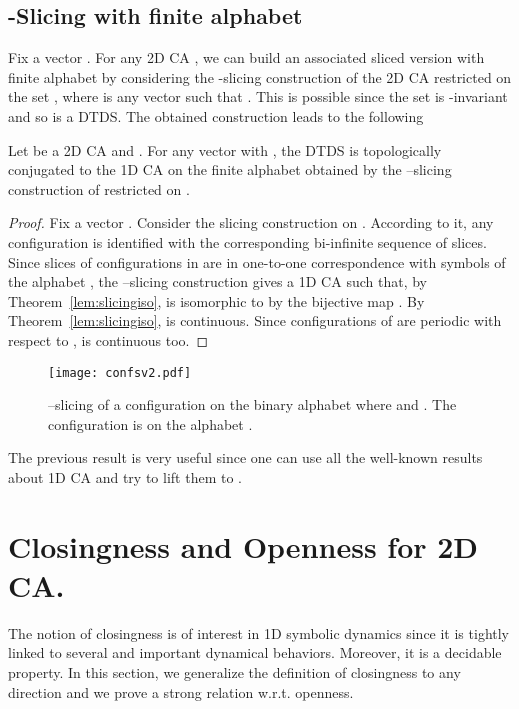 \documentclass{llncs}
\begin{document}
\subsection{-Slicing with finite alphabet}
Fix a vector . For any 2D CA , we can build an
associated sliced version  with finite alphabet by
considering the -slicing construction of the 2D CA restricted
on the set , where  is any vector such that
. This is possible since the set  is
-invariant and so  is a DTDS. The obtained
construction leads to the following
\begin{theorem}\label{lem:bz1d}
Let  be a 2D CA and . For any vector 
with , the DTDS  is topologically
conjugated to the 1D CA  on the finite
alphabet  obtained by the --slicing construction
of  restricted on .

\end{theorem}
\begin{proof}
Fix a vector . Consider the slicing construction on
. According to it, any configuration  is identified
with the corresponding bi-infinite sequence of slices. Since
slices of configurations in  are in one-to-one correspondence
with symbols of the alphabet , the --slicing construction
gives a 1D CA  such that, by
Theorem~\ref{lem:slicingiso},  is isomorphic to
 by the bijective map . By
Theorem~\ref{lem:slicingiso},  is continuous. Since
configurations of  are periodic with respect to
,  is continuous too.\end{proof}
\begin{figure}[!htb]
  \begin{center}
     \texttt{[image: confsv2.pdf]}
   \end{center}
   \caption{--slicing of a configuration 
   on the binary alphabet  where  and
   . The configuration  is on the alphabet .}
   \label{fig:slifinito}
\end{figure}
The previous result is very useful since one can use all the
well-known results about 1D CA and try to lift them to .
\section{Closingness and Openness for 2D CA.}\label{sec:clo-open}
The notion of closingness is of interest in 1D symbolic dynamics 
since it is tightly linked to several and important dynamical
behaviors. Moreover, it is a decidable property.  In this section, we generalize the definition of closingness to any direction
and we prove a strong relation w.r.t. openness.
\smallskip
\end{document}
